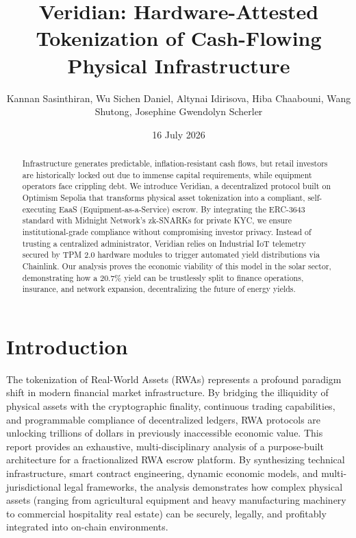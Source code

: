 \documentclass{Resources/bdlt-project}
\begin{document}

\title{Veridian: Hardware-Attested Tokenization of Cash-Flowing Physical Infrastructure}
\author{Kannan Sasinthiran, Wu Sichen Daniel, Altynai Idirisova, Hiba Chaabouni, Wang Shutong, Josephine Gwendolyn Scherler}
\date{16 July 2026}

\maketitle

\begin{abstract}
Infrastructure generates predictable, inflation-resistant cash flows, but retail investors are historically locked out due to immense capital requirements, while equipment operators face crippling debt. We introduce Veridian, a decentralized protocol built on Optimism Sepolia that transforms physical asset tokenization into a compliant, self-executing EaaS (Equipment-as-a-Service) escrow. By integrating the ERC-3643 standard with Midnight Network's zk-SNARKs for private KYC, we ensure institutional-grade compliance without compromising investor privacy. Instead of trusting a centralized administrator, Veridian relies on Industrial IoT telemetry secured by TPM 2.0 hardware modules to trigger automated yield distributions via Chainlink. Our analysis proves the economic viability of this model in the solar sector, demonstrating how a 20.7\% yield can be trustlessly split to finance operations, insurance, and network expansion, decentralizing the future of energy yields.
\end{abstract}

\section{Introduction}
The tokenization of Real-World Assets (RWAs) represents a profound paradigm shift in modern financial market infrastructure. By bridging the illiquidity of physical assets with the cryptographic finality, continuous trading capabilities, and programmable compliance of decentralized ledgers, RWA protocols are unlocking trillions of dollars in previously inaccessible economic value. This report provides an exhaustive, multi-disciplinary analysis of a purpose-built architecture for a fractionalized RWA escrow platform. By synthesizing technical infrastructure, smart contract engineering, dynamic economic models, and multi-jurisdictional legal frameworks, the analysis demonstrates how complex physical assets (ranging from agricultural equipment and heavy manufacturing machinery to commercial hospitality real estate) can be securely, legally, and profitably integrated into on-chain environments.
\end{document}
